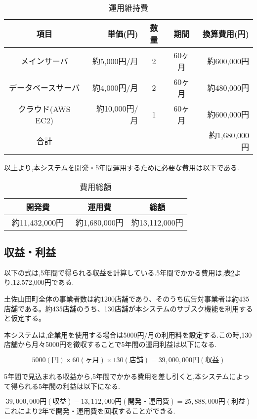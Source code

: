 \begin{table}[h]
  \centering
  \caption{運用維持費}
  \label{fig:Q11}
  \begin{tabular}{crccr}
  \hline
  項目  & 単価(円) & 数量  & 期間 & 換算費用(円) \\ \hline\hline
 
メインサーバ  & 約5,000円/月 & 2& 60ヶ月  & 約600,000円 \\ \hline

データベースサーバ & 約4,000円/月 &2& 60ヶ月 & 約480,000円 \\\hline

クラウド(AWS EC2)  &約10,000円/月&1 &60ヶ月 & 約600,000円 \\ \hline\hline

合計 &  & & & 約1,680,000円\\ \hline
\end{tabular}
\end{table}

以上より,本システムを開発・5年間運用するために必要な費用は以下である.
\begin{table}[h]
  \centering
  \caption{費用総額}
  \label{fig:Q12}
  \begin{tabular}{ccc}
  \hline
  開発費 & 運用費 & 総額  \\ \hline\hline
 約11,432,000円　& 約1,680,000円 & 約13,112,000円\\ \hline

\end{tabular}
\end{table}


\subsection{収益・利益}
以下の式は,5年間で得られる収益を計算している.5年間でかかる費用は,表\ref{fig:Q12}より,12,572,000円である.\par
土佐山田町全体の事業者数は約1200店舗であり、そのうち広告対事業者は約435店舗である。約435店舗のうち、130店舗が本システムのサブスク機能を利用すると仮定する。

本システムは,企業用を使用する場合は5000円/月の利用料を設定する.この時,130店舗から月々5000円を徴収することで5年間の運用利益は以下になる.\par

\[5000(円)\times 60(ヶ月)\times 130(店舗)=39,000,000円(収益)\]


5年間で見込まれる収益から,5年間でかかる費用を差し引くと,本システムによって得られる5年間の利益は以下になる.

\[39,000,000円(収益)-13,112,000円(開発・運用費)=25,888,000円(利益)\]
これにより2年で開発・運用費を回収することができる.









